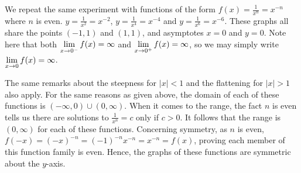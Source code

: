 We repeat the same experiment with functions of the form $f(x) = \frac{1}{x^{n}} = x^{-n}$ where $n$ is even. $y = \frac{1}{x^2} = x^{-2}$, $y = \frac{1}{x^4} = x^{-4}$ and $y = \frac{1}{x^6} = x^{-6}$.  These graphs all share the points $(-1,1)$ and $(1,1)$, and asymptotes $x = 0$ and $y = 0$.  Note here that both $\ds{\lim_{x \rightarrow 0^{-}} f(x) = \infty}$ and $\ds{\lim_{x \rightarrow 0^{+}} f(x) = \infty}$, so we may simply write $\ds{\lim_{x \rightarrow 0} f(x) = \infty}$. 

The same remarks about the steepness for $|x|<1$ and the flattening for $|x|>1$ also apply. For the same reasons as given above, the domain of each of these functions is $(-\infty, 0) \cup (0, \infty)$.  When it comes to the range, the fact $n$ is even tells us there are  solutions to $\frac{1}{x^n} = c$ only if $c>0$. It follows that the range is $(0, \infty)$ for each of these functions.  Concerning symmetry, as $n$ is even, $f(-x) = (-x)^{-n} = (-1)^{-n} x^{-n} = x^{-n} = f(x)$, proving each member of this function family is even.  Hence,  the graphs of these functions are symmetric about the $y$-axis.


